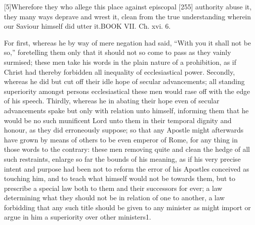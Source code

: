 [5]Wherefore they who allege this place against episcopal [255] authority abuse it, they many ways deprave and wrest it, clean from the true understanding wherein our Saviour himself did utter it.BOOK VII. Ch. xvi. 6.

For first, whereas he by way of mere negation had said, “With you it shall not be so,” foretelling them only that it should not so come to pass as they vainly surmised; these men take his words in the plain nature of a prohibition, as if Christ had thereby forbidden all inequality of ecclesiastical power. Secondly, whereas he did but cut off their idle hope of secular advancements; all standing superiority amongst persons ecclesiastical these men would rase off with the edge of his speech. Thirdly, whereas he in abating their hope even of secular advancements spake but only with relation unto himself, informing them that he would be no such munificent Lord unto them in their temporal dignity and honour, as they did erroneously suppose; so that any Apostle might afterwards have grown by means of others to be even emperor of Rome, for any thing in those words to the contrary: these men removing quite and clean the hedge of all such restraints, enlarge so far the bounds of his meaning, as if his very precise intent and purpose had been not to reform the error of his Apostles conceived as touching him, and to teach what himself would not be towards them, but to prescribe a special law both to them and their successors for ever; a law determining what they should not be in relation of one to another, a law forbidding that any such title should be given to any minister as might import or argue in him a superiority over other ministers1.

